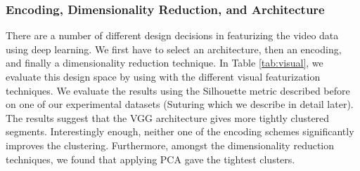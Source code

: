 \documentclass[0-main.tex]{subfiles}
\begin{document}
\subsubsection{Encoding, Dimensionality Reduction, and Architecture}
There are a number of different design decisions in featurizing the video data using deep learning. 
We first have to select an architecture, then an encoding, and finally a dimensionality reduction technique.
In Table \ref{tab:visual}, we evaluate this design space by using \tsc with the different visual featurization techniques.
We evaluate the results using the Silhouette metric described before on one of our experimental datasets (Suturing which we describe in detail later).
The results suggest that the VGG architecture gives more tightly clustered segments.
Interestingly enough, neither one of the encoding schemes significantly improves the clustering.
Furthermore, amongst the dimensionality reduction techniques, we found that applying PCA gave the tightest clusters.
\end{document}
